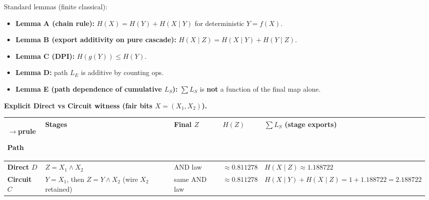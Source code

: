 \documentclass[
  11pt,
]{article}
\newcounter{none} %
\providecommand{\tightlist}{%
  \setlength{\itemsep}{0pt}\setlength{\parskip}{0pt}}
\begin{document}
Standard lemmas (finite classical):

\begin{itemize}
\tightlist
\item
  \textbf{Lemma A (chain rule):} \(H(X)=H(Y)+H(X\mid Y)\) for deterministic \(Y=f(X)\).\\
\item
  \textbf{Lemma B (export additivity on pure cascade):} \(H(X\mid Z)=H(X\mid Y)+H(Y\mid Z)\).\\
\item
  \textbf{Lemma C (DPI):} \(H(g(Y))\le H(Y)\).\\
\item
  \textbf{Lemma D:} path \(L_E\) is additive by counting ops.\\
\item
  \textbf{Lemma E (path dependence of cumulative \(L_S\)):} \(\sum L_S\) is \textbf{not} a function of the final map alone.
\end{itemize}

\textbf{Explicit Direct vs Circuit witness (fair bits \(X=(X_1,X_2)\)).}

{\def\LTcaptype{none} %
\begin{longtable}[]{@{}
  >{\raggedright\arraybackslash}p{}
  >{\raggedright\arraybackslash}p{}
  >{\raggedright\arraybackslash}p{}
  >{\raggedright\arraybackslash}p{}
  >{\raggedright\arraybackslash}p{}@{}}
$\rightarrow$prule\noalign{}
\begin{minipage}[b]{\linewidth}\raggedright
Path
\end{minipage} & \begin{minipage}[b]{\linewidth}\raggedright
Stages
\end{minipage} & \begin{minipage}[b]{\linewidth}\raggedright
Final \(Z\)
\end{minipage} & \begin{minipage}[b]{\linewidth}\raggedright
\(H(Z)\)
\end{minipage} & \begin{minipage}[b]{\linewidth}\raggedright
\(\sum L_S\) (stage exports)
\end{minipage} \\
\midrule\noalign{}
\endhead
\bottomrule\noalign{}
\endlastfoot
\textbf{Direct \(D\)} & \(Z=X_1\land X_2\) & AND law & \(\approx 0.811278\) & \(H(X\mid Z)\approx 1.188722\) \\
\textbf{Circuit \(C\)} & \(Y=X_1\), then \(Z=Y\land X_2\) (wire \(X_2\) retained) & same AND law & \(\approx 0.811278\) & \(H(X\mid Y)+H(X\mid Z)=1+1.188722=2.188722\) \\
\end{longtable}
}
\end{document}
